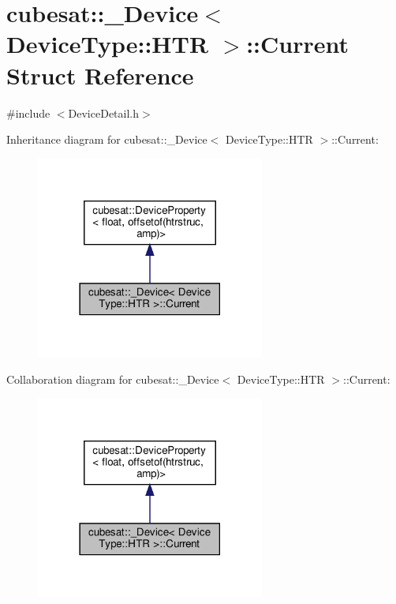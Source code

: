 \hypertarget{structcubesat_1_1__Device_3_01DeviceType_1_1HTR_01_4_1_1Current}{}\section{cubesat\+:\+:\+\_\+\+Device$<$ Device\+Type\+:\+:H\+TR $>$\+:\+:Current Struct Reference}
\label{structcubesat_1_1__Device_3_01DeviceType_1_1HTR_01_4_1_1Current}


{\ttfamily \#include $<$Device\+Detail.\+h$>$}



Inheritance diagram for cubesat\+:\+:\+\_\+\+Device$<$ Device\+Type\+:\+:H\+TR $>$\+:\+:Current\+:\nopagebreak
\begin{figure}[H]
\begin{center}
\leavevmode
\includegraphics[width=213pt]{structcubesat_1_1__Device_3_01DeviceType_1_1HTR_01_4_1_1Current__inherit__graph}
\end{center}
\end{figure}


Collaboration diagram for cubesat\+:\+:\+\_\+\+Device$<$ Device\+Type\+:\+:H\+TR $>$\+:\+:Current\+:\nopagebreak
\begin{figure}[H]
\begin{center}
\leavevmode
\includegraphics[width=213pt]{structcubesat_1_1__Device_3_01DeviceType_1_1HTR_01_4_1_1Current__coll__graph}
\end{center}
\end{figure}
